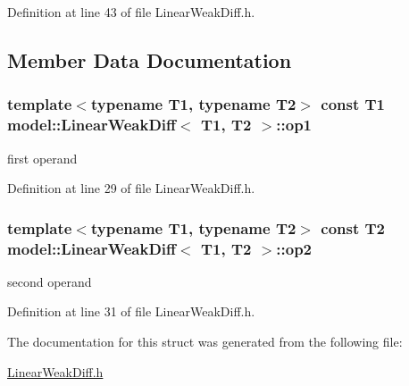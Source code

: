 Definition at line 43 of file Linear\+Weak\+Diff.\+h.



\subsection{Member Data Documentation}
\hypertarget{structmodel_1_1_linear_weak_diff_a4c5b37ae14b0f9d09f3999a186c4afbe}{}
\subsubsection[{op1}]{\setlength{\rightskip}{0pt plus 5cm}template$<$typename T1, typename T2$>$ const T1 {\bf model\+::\+Linear\+Weak\+Diff}$<$ T1, T2 $>$\+::op1}\label{structmodel_1_1_linear_weak_diff_a4c5b37ae14b0f9d09f3999a186c4afbe}


first operand 



Definition at line 29 of file Linear\+Weak\+Diff.\+h.

\hypertarget{structmodel_1_1_linear_weak_diff_a38826dfbd3f9205c180335f6e480a166}{}
\subsubsection[{op2}]{\setlength{\rightskip}{0pt plus 5cm}template$<$typename T1, typename T2$>$ const T2 {\bf model\+::\+Linear\+Weak\+Diff}$<$ T1, T2 $>$\+::op2}\label{structmodel_1_1_linear_weak_diff_a38826dfbd3f9205c180335f6e480a166}


second operand 



Definition at line 31 of file Linear\+Weak\+Diff.\+h.



The documentation for this struct was generated from the following file\+:\begin{DoxyCompactItemize}
\item 
\hyperlink{_linear_weak_diff_8h}{Linear\+Weak\+Diff.\+h}\end{DoxyCompactItemize}
